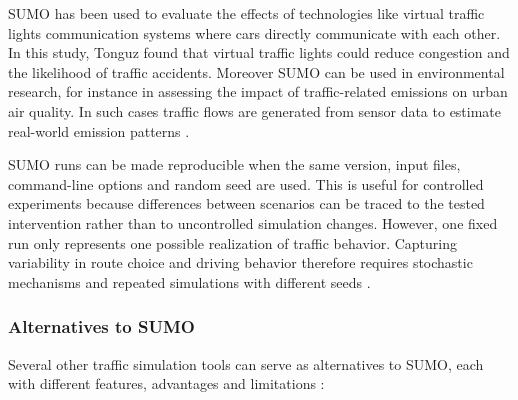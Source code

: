 SUMO has been used to evaluate the effects of technologies like virtual traffic lights communication systems where cars directly communicate with each other. \cite{SUMO_VTL} In this study, Tonguz found that virtual traffic lights could reduce congestion and the likelihood of traffic accidents.  Moreover SUMO can be used in environmental research, for instance in assessing the impact of traffic-related emissions on urban air quality. In such cases traffic flows are generated from sensor data to estimate real-world emission patterns \cite{SUMO_emission}. 

SUMO runs can be made reproducible when the same version, input files, command-line options and
random seed are used. This is useful for controlled experiments because differences between
scenarios can be traced to the tested intervention rather than to uncontrolled simulation changes.
However, one fixed run only represents one possible realization of traffic behavior. Capturing
variability in route choice and driving behavior therefore requires stochastic mechanisms and
repeated simulations with different seeds \cite{SUMO_sumo,sumo_randomness}.




\subsubsection{Alternatives to SUMO}
Several other traffic simulation tools can serve as alternatives to SUMO, each with different features, advantages and limitations : 

